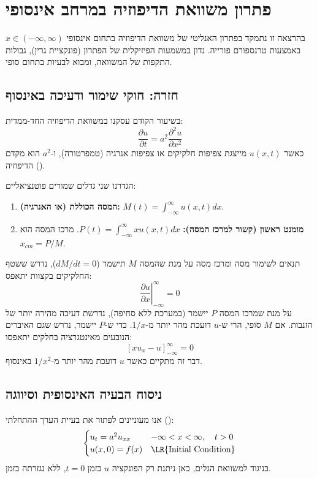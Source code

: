 \section{פתרון משוואת הדיפוזיה במרחב אינסופי}

בהרצאה זו נתמקד בפתרון האנליטי של משוואת הדיפוזיה בתחום אינסופי $x \in (-\infty, \infty)$ באמצעות טרנספורם פורייה. נדון במשמעות הפיזיקלית של הפתרון (פונקציית גרין), גבולות התקפות של המשוואה, ומבוא לבעיות בתחום סופי.

\subsection{חזרה: חוקי שימור ודעיכה באינסוף}
בשיעור הקודם עסקנו במשוואת הדיפוזיה החד-ממדית:
\begin{equation}
    \frac{\partial u}{\partial t} = a^2 \frac{\partial^2 u}{\partial x^2}
\end{equation}
כאשר $u(x,t)$ מייצגת צפיפות חלקיקים או צפיפות אנרגיה (טמפרטורה), ו-$a^2$ הוא מקדם הדיפוזיה ().

הגדרנו שני גדלים שמורים פוטנציאליים:
\begin{enumerate}
    \item \textbf{המסה הכוללת (או האנרגיה):} $M(t) = \int_{-\infty}^{\infty} u(x,t) dx$.
    \item \textbf{מומנט ראשון (קשור למרכז המסה):} $P(t) = \int_{-\infty}^{\infty} x u(x,t) dx$. מרכז המסה הוא $x_{cm} = P/M$.
\end{enumerate}

\begin{theorembox}{תנאים לשימור מסה ומרכז מסה}
    על מנת שהמסה $M$ תישמר ($dM/dt = 0$), נדרש ששטף החלקיקים בקצוות יתאפס:
    \[ \left. \frac{\partial u}{\partial x} \right|_{-\infty}^{\infty} = 0 \]
    על מנת שמרכז המסה $P$ יישמר (במערכת ללא סחיפה), נדרשת דעיכה מהירה יותר של הזנבות. אם $M$ סופי, הרי ש-$u$ דועכת מהר יותר מ-$1/x$. כדי ש-$P$ יישמר, נדרש שגם האיברים הנובעים מאינטגרציה בחלקים יתאפסו:
    \[ [x u_x - u]_{-\infty}^{\infty} = 0 \]
    דבר זה מתקיים כאשר $u$ דועכת מהר יותר מ-$1/x^2$ באינסוף.
\end{theorembox}

\subsection{ניסוח הבעיה האינסופית וסיווגה}
אנו מעוניינים לפתור את בעיית הערך ההתחלתי ():
\begin{equation}
    \begin{cases}
        u_t = a^2 u_{xx} & -\infty < x < \infty, \quad t > 0 \\
        u(x,0) = f(x) & \text{\LR{Initial Condition}}
    \end{cases}
\end{equation}
בניגוד למשוואת הגלים, כאן ניתנת רק הפונקציה $u$ בזמן $t=0$, ללא נגזרתה בזמן.

